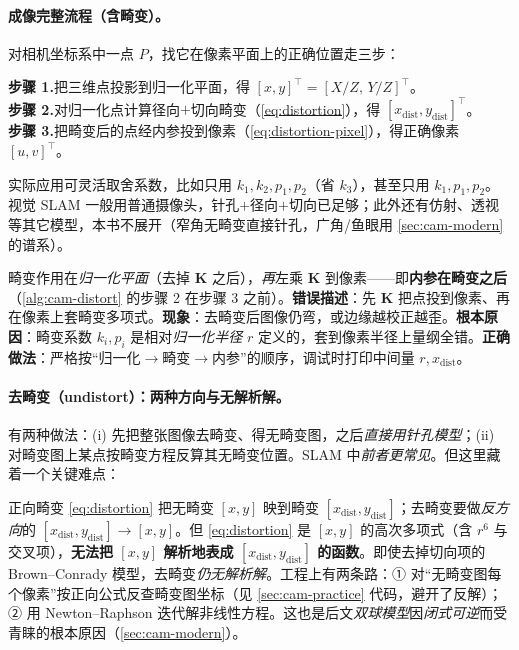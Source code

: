 \paragraph{成像完整流程（含畸变）。}
对相机坐标系中一点 $P$，找它在像素平面上的正确位置走三步\cite{gaoxiang2019slam14}：

\begin{algo}[含畸变的成像三步]\label{alg:cam-distort}
\textbf{步骤 1.}\;把三维点投影到归一化平面，得 $[x,y]^\top=[X/Z,\,Y/Z]^\top$。\\
\textbf{步骤 2.}\;对归一化点计算径向$+$切向畸变（\cref{eq:distortion}），得 $[x_{\text{dist}},y_{\text{dist}}]^\top$。\\
\textbf{步骤 3.}\;把畸变后的点经内参投到像素（\cref{eq:distortion-pixel}），得正确像素 $[u,v]^\top$。
\end{algo}

\noindent 实际应用可灵活取舍系数，比如只用 $k_1,k_2,p_1,p_2$（省 $k_3$），甚至只用 $k_1,p_1,p_2$\cite{gaoxiang2019slam14}。视觉 SLAM 一般用普通摄像头，针孔$+$径向$+$切向已足够；此外还有仿射、透视等其它模型，本书不展开（窄角无畸变直接针孔，广角/鱼眼用 \cref{sec:cam-modern} 的谱系）。

\begin{pitfall}[畸变的作用顺序]
畸变作用在\emph{归一化平面}（去掉 $\mathbf{K}$ 之后），\emph{再}左乘 $\mathbf{K}$ 到像素——即\textbf{内参在畸变之后}（\cref{alg:cam-distort} 的步骤 2 在步骤 3 之前）。\textbf{错误描述}：先 $\mathbf{K}$ 把点投到像素、再在像素上套畸变多项式。\textbf{现象}：去畸变后图像仍弯，或边缘越校正越歪。\textbf{根本原因}：畸变系数 $k_i,p_i$ 是相对\emph{归一化半径} $r$ 定义的，套到像素半径上量纲全错。\textbf{正确做法}：严格按“归一化$\to$畸变$\to$内参”的顺序，调试时打印中间量 $r,x_{\text{dist}}$。
\end{pitfall}

\paragraph{去畸变（undistort）：两种方向与无解析解。}
有两种做法\cite{gaoxiang2019slam14}：(i) 先把整张图像去畸变、得无畸变图，之后\emph{直接用针孔模型}；(ii) 对畸变图上某点按畸变方程反算其无畸变位置。SLAM 中\emph{前者更常见}。但这里藏着一个关键难点：

\begin{insight}[径向-切向模型的去畸变没有解析解]
正向畸变 \cref{eq:distortion} 把无畸变 $[x,y]$ 映到畸变 $[x_{\text{dist}},y_{\text{dist}}]$；去畸变要做\emph{反方向}的 $[x_{\text{dist}},y_{\text{dist}}]\to[x,y]$。但 \cref{eq:distortion} 是 $[x,y]$ 的高次多项式（含 $r^6$ 与交叉项），\textbf{无法把 $[x,y]$ 解析地表成 $[x_{\text{dist}},y_{\text{dist}}]$ 的函数}\cite{carlone2026handbook}。即使去掉切向项的 Brown--Conrady 模型，去畸变\emph{仍无解析解}。工程上有两条路：① 对“无畸变图每个像素”按正向公式反查畸变图坐标（见 \cref{sec:cam-practice} 代码，避开了反解）；② 用 Newton--Raphson 迭代解非线性方程。这也是后文\emph{双球模型}因\emph{闭式可逆}而受青睐的根本原因（\cref{sec:cam-modern}）。
\end{insight}

